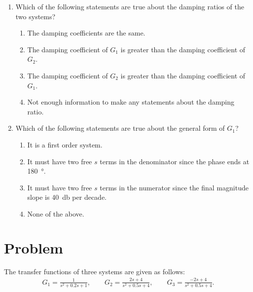 \documentclass[titlepage, 11pt, reqno]{article}    %
\begin{document}
\begin{enumerate}
    \item Which of the following statements are true about the damping ratios of the two systems?
    \begin{enumerate}
        \item The damping coefficients are the same.
        \item The damping coefficient of \(G_1\) is greater than the damping coefficient of \(G_2\).
        \item The damping coefficient of \(G_2\) is greater than the damping coefficient of \(G_1\).
        \item Not enough information to make any statements about the damping ratio.
    \end{enumerate} 
    \item Which of the following statements are true about the general form of \(G_1\)?
    \begin{enumerate}
        \item It is a first order system.
        \item It must have two free \(s\) terms in the denominator since the phase ends at \SI{180}{\degree}.
        \item It must have two free \(s\) terms in the numerator since the final magnitude slope is \SI{40}{\decibel} per decade.
        \item None of the above.
    \end{enumerate}
\end{enumerate}
\clearpage

\section{Problem}\label{prob:tf_match}

The transfer functions of three systems are given as follows:
\begin{align*}
    G_1 = \frac{1}{s^2 + 0.2 s+ 1}, \qquad G_2 = \frac{2s +4}{s^2 + 0.5 s + 4}, \qquad G_3 = \frac{-2s + 4}{s^2 + 0.5 s +4}.
\end{align*}
\end{document}
